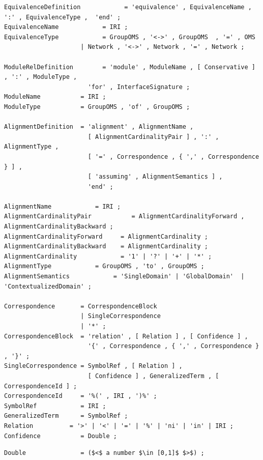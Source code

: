 \documentclass[10pt,fleqn,final]{scrreprt}
\makeatletter
\newcommand*\CommentAuthor{}
\renewcommand*\CommentAuthor{#1}}
\newcommand*\CommentDate{}
\renewcommand*\CommentDate{#1}}
\newcommand*\CommentId{}
\renewcommand*\CommentId{#1}}
\newcommand*\CommentType{}
\renewcommand*\CommentType{#1}}
\newcommand*{\SetCommentColorByType}[1]{%
\edef\localType{{#1}}%
\expandafter\ifstrequal\localType{q-aut}{\colorlet{CommentColor}{red}}{%
\expandafter\ifstrequal\localType{q-all}{\colorlet{CommentColor}{orange}}{%
\expandafter\ifstrequal\localType{todo}{\colorlet{CommentColor}{orange}}{%
\expandafter\ifstrequal\localType{fyi}{\colorlet{CommentColor}{lightgray}}{%
\colorlet{CommentColor}{yellow}}}}}}
\newcommand*{\SetCommentPrefixByType}[1]{%
\edef\localType{{#1}}%
\expandafter\@ifmtarg\localType{%
\edef\CommentPrefix{}%
}{%
\caseupper[q]{#1}%
\edef\CommentPrefix{\thestring: }%
}}
\newcommand*{\initComment}[1]{%
\setkeys{Comment}{#1}%
\SetCommentColorByType{\CommentType}%
\relax%
\SetCommentPrefixByType{\CommentType}%
\relax%
}
\newcommand*{\todonote}[2][]{%
\initComment{#1}%
\pdfcomment[author=\CommentAuthor,color=CommentColor,date=\CommentDate,id=\CommentId]{%
\CommentPrefix
#2}}
\renewcommand*{\todonote}[2][]{%
\initComment{#1}%
\ednote{\CommentPrefix #2}}
\newcommand*{\CLnote}[2][author=Christoph Lange]{%
\todonote[author=Christoph Lange,#1]{#2} 
}
\newenvironment{definitions}[0]{\medskip }{}
\makeatother
\begin{document}
\begin{definitions}
\begin{lstlisting}[language=ebnf,mathescape]
EquivalenceDefinition            = 'equivalence' , EquivalenceName , ':' , EquivalenceType ,  'end' ;
EquivalenceName            = IRI ;
EquivalenceType            = GroupOMS , '<->' , GroupOMS  , '=' , OMS 
                     | Network , '<->' , Network , '=' , Network ;

ModuleRelDefinition        = 'module' , ModuleName , [ Conservative ] , ':' , ModuleType ,
                       'for' , InterfaceSignature ;
ModuleName           = IRI ;
ModuleType           = GroupOMS , 'of' , GroupOMS ;

AlignmentDefinition  = 'alignment' , AlignmentName ,
                       [ AlignmentCardinalityPair ] , ':' , AlignmentType ,
                       [ '=' , Correspondence , { ',' , Correspondence } ] ,
                       [ 'assuming' , AlignmentSemantics ] ,
                       'end' ;

AlignmentName            = IRI ;
AlignmentCardinalityPair           = AlignmentCardinalityForward , AlignmentCardinalityBackward ;
AlignmentCardinalityForward     = AlignmentCardinality ;
AlignmentCardinalityBackward    = AlignmentCardinality ;
AlignmentCardinality            = '1' | '?' | '+' | '*' ;
AlignmentType            = GroupOMS , 'to' , GroupOMS ;
AlignmentSemantics            = 'SingleDomain' | 'GlobalDomain'  | 'ContextualizedDomain' ;

Correspondence       = CorrespondenceBlock
                     | SingleCorrespondence
                     | '*' ;
CorrespondenceBlock  = 'relation' , [ Relation ] , [ Confidence ] , 
                       '{' , Correspondence , { ',' , Correspondence } , '}' ;
SingleCorrespondence = SymbolRef , [ Relation ] ,
                       [ Confidence ] , GeneralizedTerm , [ CorrespondenceId ] ;
CorrespondenceId     = '%(' , IRI , ')%' ;
SymbolRef            = IRI ;
GeneralizedTerm      = SymbolRef ;
Relation          = '>' | '<' | '=' | '%' | 'ni' | 'in' | IRI ;
Confidence           = Double ; 
\end{lstlisting}
\begin{lstlisting}[language=ebnf,escapeinside={()}]
Double               = ($<$ a number $\in [0,1]$ $>$) ;
\end{lstlisting}






\end{definitions}
\end{document}

